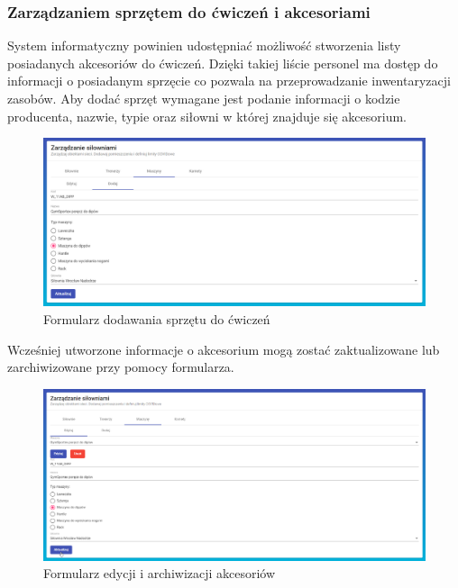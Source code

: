 \documentclass[a4paper,twoside,12pt]{book}
\begin{document}
\subsubsection{Zarządzaniem sprzętem do ćwiczeń i akcesoriami}
System informatyczny powinien udostępniać możliwość stworzenia listy posiadanych akcesoriów do ćwiczeń. Dzięki takiej liście personel ma dostęp do informacji o posiadanym sprzęcie co pozwala na przeprowadzanie inwentaryzacji zasobów. Aby dodać sprzęt wymagane jest podanie informacji o kodzie producenta, nazwie, typie oraz siłowni w której znajduje się akcesorium.
\begin{figure}[H]
	\centering
	\includegraphics[width=1\linewidth]{../zrzuty_ekranu/dzialanie/akcesoria/dodawanie_akcesoriun}
	\caption{Formularz dodawania sprzętu do ćwiczeń}
	\label{fig:dodawanieakcesoriun}
\end{figure}

Wcześniej utworzone informacje o akcesorium mogą zostać zaktualizowane lub zarchiwizowane przy pomocy formularza.
\begin{figure}[H]
	\centering
	\includegraphics[width=1\linewidth]{../zrzuty_ekranu/dzialanie/akcesoria/aktualizacja_akcesorium}
	\caption{Formularz edycji i archiwizacji akcesoriów}
	\label{fig:aktualizacjaakcesorium}
\end{figure}
\end{document}
